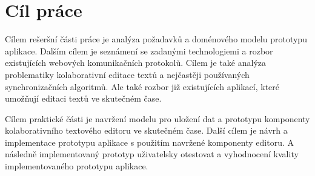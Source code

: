 
\chapter{Cíl práce}

Cílem rešeršní části práce je analýza požadavků a doménového modelu prototypu aplikace.
Dalším cílem je seznámení se zadanými technologiemi a rozbor existujících webových komunikačních protokolů.
Cílem je také analýza problematiky kolaborativní editace textů a nejčastěji používaných synchronizačních algoritmů.
Ale také rozbor již existujících aplikací, které umožňují editaci textů ve skutečném čase.




Cílem praktické části je navržení modelu pro uložení dat a prototypu komponenty kolaborativního textového editoru ve skutečném čase.
Další cílem je návrh a implementace prototypu aplikace s použitím navržené komponenty editoru.
A následně implementovaný prototyp uživatelsky otestovat a vyhodnocení kvality implementovaného prototypu aplikace.

